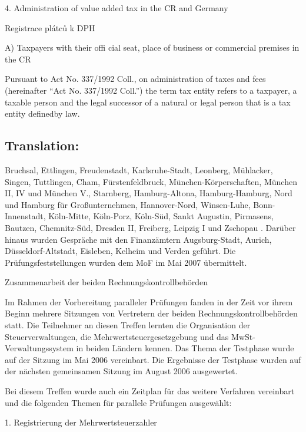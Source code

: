 \documentclass[10pt]{article}
\begin{document}
4. Administration of value added tax in the CR and Germany



Registrace plátců k DPH



A) Taxpayers with their offi cial seat, place of business or commercial premises in the CR



Pursuant to Act No. 337/1992 Coll., on administration of taxes and fees (hereinafter “Act No. 337/1992 Coll.”) the term tax entity refers to a taxpayer, a taxable person and the legal successor of a natural or legal person that is a tax entity definedby law. 



\pagebreak

\subsection*{Translation:}

Bruchsal, Ettlingen, Freudenstadt, Karlsruhe-Stadt, Leonberg, Mühlacker, Singen, Tuttlingen, Cham, Fürstenfeldbruck, München-Körperschaften, München II, IV und München V., Starnberg, Hamburg-Altona, Hamburg-Hamburg, Nord und Hamburg für Großunternehmen, Hannover-Nord, Winsen-Luhe, Bonn-Innenstadt, Köln-Mitte, Köln-Porz, Köln-Süd, Sankt Augustin, Pirmasens, Bautzen, Chemnitz-Süd, Dresden II, Freiberg, Leipzig I und Zschopau .
Darüber hinaus wurden Gespräche mit den Finanzämtern Augsburg-Stadt, Aurich, Düsseldorf-Altstadt, Eisleben, Kelheim und Verden geführt.
Die Prüfungsfeststellungen wurden dem MoF im Mai 2007 übermittelt.


Zusammenarbeit der beiden Rechnungskontrollbehörden

Im Rahmen der Vorbereitung paralleler Prüfungen fanden in der Zeit vor ihrem Beginn mehrere Sitzungen von Vertretern der beiden Rechnungskontrollbehörden statt.
Die Teilnehmer an diesen Treffen lernten die Organisation der Steuerverwaltungen, die Mehrwertsteuergesetzgebung und das MwSt-Verwaltungssystem in beiden Ländern kennen.
Das Thema der Testphase wurde auf der Sitzung im Mai 2006 vereinbart.
Die Ergebnisse der Testphase wurden auf der nächsten gemeinsamen Sitzung im August 2006 ausgewertet.


Bei diesem Treffen wurde auch ein Zeitplan für das weitere Verfahren vereinbart und die folgenden Themen für parallele Prüfungen ausgewählt:



1. Registrierung der Mehrwertsteuerzahler
\end{document}

